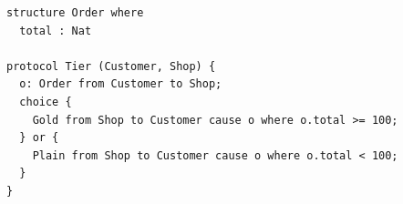 \begin{lstlisting}[language={},basicstyle=\ttfamily\footnotesize,breaklines=true]
structure Order where
  total : Nat

protocol Tier (Customer, Shop) {
  o: Order from Customer to Shop;
  choice {
    Gold from Shop to Customer cause o where o.total >= 100;
  } or {
    Plain from Shop to Customer cause o where o.total < 100;
  }
}
\end{lstlisting}
